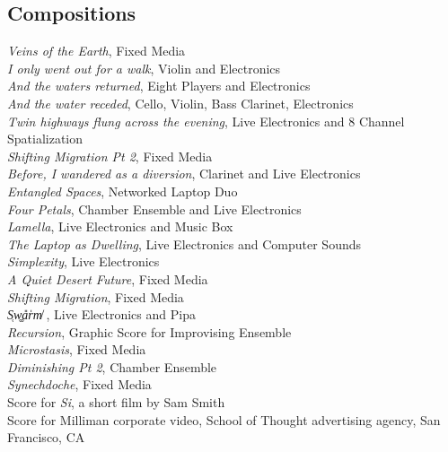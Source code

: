 \documentclass[12pt, a4paper]{article}
\newcommand{\years}[1]{\marginnote{\scriptsize #1}}
\begin{document}
\subsection*{Compositions}
\years{2024} 
\textit{Veins of the Earth}, Fixed Media\\ 
\years{2017}
\textit{I only went out for a walk}, Violin and Electronics\\
\textit{And the waters returned}, Eight Players and Electronics \\
\textit{And the water receded}, Cello, Violin, Bass Clarinet, Electronics \\
\years{2016} 
\textit{Twin highways flung across the evening}, Live Electronics and 8 Channel Spatialization \\
\textit{Shifting Migration Pt 2}, Fixed Media \\
\textit{Before, I wandered as a diversion}, Clarinet and Live Electronics\\
\textit{Entangled Spaces}, Networked Laptop Duo \\
\textit{Four Petals}, Chamber Ensemble and Live Electronics\\
\textit{Lamella}, Live Electronics and Music Box\\
\textit{The Laptop as Dwelling}, Live Electronics and Computer Sounds\\
\textit{Simplexity}, Live Electronics \\
\textit{A Quiet Desert Future}, Fixed Media\\
\textit{Shifting Migration}, Fixed Media \\
\years{2015}
\textit{S̜w͚a̎r̍m̸}  , Live Electronics and Pipa\\  
\textit{Recursion}, Graphic Score for Improvising Ensemble \\  
\textit{Microstasis}, Fixed Media\\  
\textit{Diminishing Pt 2}, Chamber Ensemble \\  
\textit{Synechdoche}, Fixed Media \\  
Score for \textit{Si}, a short film by Sam Smith\\  
Score for Milliman corporate video, School of Thought advertising agency, San Francisco, CA\\  
\years{2012} 
\end{document}

